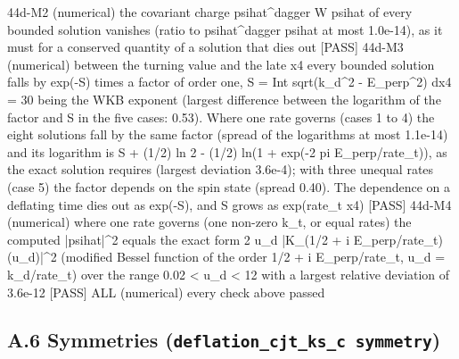 \documentclass[
  10pt,
]{article}
\newenvironment{Shaded}{}{}
\newcommand{\NormalTok}[1]{#1}
\begin{document}
\begin{Shaded}
\begin{Highlighting}[]
\NormalTok{[PASS] 44d{-}M2  (numerical) the covariant charge psihat\^{}dagger W psihat of every bounded solution vanishes (ratio to psihat\^{}dagger psihat at most 1.0e{-}14), as it must for a conserved quantity of a solution that dies out}
\NormalTok{[PASS] 44d{-}M3  (numerical) between the turning value and the late x4 every bounded solution falls by exp({-}S) times a factor of order one, S = Int sqrt(k\_d\^{}2 {-} E\_perp\^{}2) dx4 = 30 being the WKB exponent (largest difference between the logarithm of the factor and S in the five cases: 0.53). Where one rate governs (cases 1 to 4) the eight solutions fall by the same factor (spread of the logarithms at most 1.1e{-}14) and its logarithm is S + (1/2) ln 2 {-} (1/2) ln(1 + exp({-}2 pi E\_perp/rate\_t)), as the exact solution requires (largest deviation 3.6e{-}4); with three unequal rates (case 5) the factor depends on the spin state (spread 0.40). The dependence on a deflating time dies out as exp({-}S), and S grows as exp(rate\_t x4)}
\NormalTok{[PASS] 44d{-}M4  (numerical) where one rate governs (one non{-}zero k\_t, or equal rates) the computed |psihat|\^{}2 equals the exact form 2 u\_d |K\_(1/2 + i E\_perp/rate\_t)(u\_d)|\^{}2 (modified Bessel function of the order 1/2 + i E\_perp/rate\_t, u\_d = k\_d/rate\_t) over the range 0.02 \textless{} u\_d \textless{} 12 with a largest relative deviation of 3.6e{-}12}
\NormalTok{[PASS] ALL  (numerical) every check above passed}
\end{Highlighting}
\end{Shaded}

\hypertarget{a.6-symmetries-deflation_cjt_ks_c-symmetry}{%
\subsection{\texorpdfstring{A.6 Symmetries
(\texttt{deflation\_cjt\_ks\_c\ symmetry})}{A.6 Symmetries (deflation\_cjt\_ks\_c symmetry)}}\label{a.6-symmetries-deflation_cjt_ks_c-symmetry}}
\end{document}
